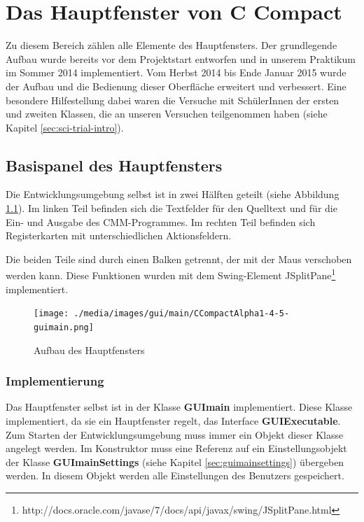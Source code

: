 



\chapter{Das Hauptfenster von C Compact}
\label{sec:gui-main}
Zu diesem Bereich zählen alle Elemente des Hauptfensters. Der grundlegende Aufbau wurde bereits vor dem Projektstart entworfen und in unserem Praktikum im Sommer 2014 implementiert. Vom Herbst 2014 bis Ende Januar 2015 wurde der Aufbau und die Bedienung dieser Oberfläche erweitert und verbessert. Eine besondere Hilfestellung dabei waren die Versuche mit SchülerInnen der ersten und zweiten Klassen, die an unseren Versuchen teilgenommen haben (siehe Kapitel \ref{sec:sci-trial-intro}).

\section{Basispanel des Hauptfensters}
\label{sec:gui-main}
Die Entwicklungsumgebung selbst ist in zwei Hälften geteilt (siehe Abbildung \ref{fig:gui-main-1}). Im linken Teil befinden sich die Textfelder für den Quelltext und für die Ein- und Ausgabe des CMM-Programmes. Im rechten Teil befinden sich Registerkarten mit unterschiedlichen Aktionsfeldern.

Die beiden Teile sind durch einen Balken getrennt, der mit der Maus verschoben werden kann. Diese Funktionen wurden mit dem Swing-Element JSplitPane\footnote{http://docs.oracle.com/javase/7/docs/api/javax/swing/JSplitPane.html} implementiert.

\begin{figure}[h] 
  \centering
     \texttt{[image: ./media/images/gui/main/CCompactAlpha1-4-5-guimain.png]}
  \caption{Aufbau des Hauptfensters}
  \label{fig:gui-main-1}
\end{figure}

\subsection{Implementierung}
\label{sec:gui-main-impl}
Das Hauptfenster selbst ist in der Klasse \textbf{GUImain} implementiert. Diese Klasse implementiert, da sie ein Hauptfenster regelt, das Interface \textbf{GUIExecutable}. Zum Starten der Entwicklungsumgebung muss immer ein Objekt dieser Klasse angelegt werden. Im Konstruktor muss eine Referenz auf ein Einstellungsobjekt der Klasse \textbf{GUImainSettings} (siehe Kapitel \ref{sec:guimainsettings}) übergeben werden. In diesem Objekt werden alle Einstellungen des Benutzers gespeichert.

